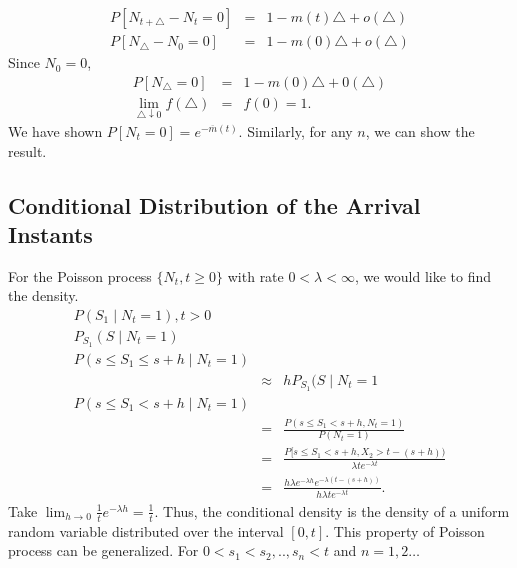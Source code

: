 \documentclass[a4paper,10pt]{article}
\theoremstyle{plain}
\theoremstyle{definition}
\begin{document}
  \begin{eqnarray*}
  P[N_{t+\triangle}-N_{t}=0] &=& 1-m(t)\triangle +o(\triangle) \\
  P[N_{\triangle}-N_{0}=0] &=& 1-m(0)\triangle +o(\triangle) 
  \end{eqnarray*}
  Since $ N_{0}=0$, 
  \begin{eqnarray*}
   P[N_{\triangle} =0]&=& 1-m(0)\triangle +0(\triangle) \\
  \lim_{\triangle\downarrow 0}f(\triangle) &=& f(0)=1.
\end{eqnarray*}
We have shown $P[N_{t}=0] = e^{-\overline{m}(t)}$. Similarly, for any $n$, we can show the result.

\subsection{Conditional Distribution of the Arrival Instants}
\noindent For the Poisson process $\{N_{t}, t\geq 0\}$ with rate $0<\lambda< \infty$, we would like to find the density.
\begin{eqnarray*}
  P(S_{1}\mid N_{t}=1), t>0 \\
  P_{S_1}(S \mid N_{t}=1) \\
  P(s\leq S_{1} \leq s+h \mid N_{t}=1)\\
   &\approx& h P_{S_1}(S \mid N_{t}=1 \\
  P(s\leq S_{1}< s+h \mid N_{t}=1)\\
   &=& \frac{P(s\leq S_{1}< s+h,N_{t}=1)}{P(N_{t}=1)}\\
   &=& \frac{P[s\leq S_{1}<s+h,X_{2}>t-(s+h))}{\lambda t e^{-\lambda t}} \\
   &=& \frac{h \lambda e^{-\lambda h} e^{-\lambda (t-(s+h))}}{h{\lambda t} e^{-\lambda t}}.
   \end{eqnarray*}
   Take  $\lim _{h\rightarrow 0}\frac{1}{t}{e^{-\lambda h}} =\frac{1}{t}.$ Thus, the conditional density is the density of a uniform random variable distributed over the interval $[0,t].$ This property of Poisson process can be generalized. For $0<s_{1}<s_{2},.., s_{n}<t$ and $n=1,2 \hdots$ \\
\end{document}
